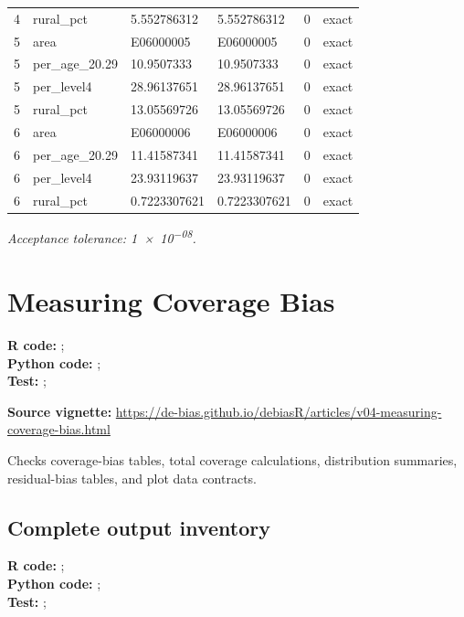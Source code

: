\documentclass[10pt]{article}
\begin{document}
\begin{longtable}{@{}r p{}p{}p{}rl@{}}
4 & rural\_\allowbreak{}pct & 5.552786312 & 5.552786312 & 0 & exact \\
5 & area & E06000005 & E06000005 & 0 & exact \\
5 & per\_\allowbreak{}age\_\allowbreak{}20.29 & 10.9507333 & 10.9507333 & 0 & exact \\
5 & per\_\allowbreak{}level4 & 28.96137651 & 28.96137651 & 0 & exact \\
5 & rural\_\allowbreak{}pct & 13.05569726 & 13.05569726 & 0 & exact \\
6 & area & E06000006 & E06000006 & 0 & exact \\
6 & per\_\allowbreak{}age\_\allowbreak{}20.29 & 11.41587341 & 11.41587341 & 0 & exact \\
6 & per\_\allowbreak{}level4 & 23.93119637 & 23.93119637 & 0 & exact \\
6 & rural\_\allowbreak{}pct & 0.7223307621 & 0.7223307621 & 0 & exact \\
\bottomrule
\end{longtable}
\normalsize
\textit{Acceptance tolerance: \num{1e-08}.}

\section{Measuring Coverage Bias}
{\footnotesize \textbf{R code:} ; \\ \textbf{Python code:} ; \\ \textbf{Test:} ; \par}


\textbf{Source vignette:} \url{https://de-bias.github.io/debiasR/articles/v04-measuring-coverage-bias.html}



Checks coverage-bias tables, total coverage calculations, distribution summaries, residual-bias tables, and plot data contracts.



\subsection{Complete output inventory}
{\footnotesize \textbf{R code:} ; \\ \textbf{Python code:} ; \\ \textbf{Test:} ; \par}
\end{document}

